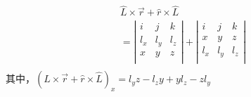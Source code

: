 $$
\begin{array}{l}
	\hat{L}\times \vec{r}+\hat{r}\times \hat{L}\\
	=\left| \begin{matrix}
	i&		j&		k\\
	l_x&		l_y&		l_z\\
	x&		y&		z\\
\end{matrix} \right|+\left| \begin{matrix}
	i&		j&		k\\
	x&		y&		z\\
	l_x&		l_y&		l_z\\
\end{matrix} \right|\\
\end{array}
$$
其中，$\left(\hat{L}\times \vec{r}+\hat{r}\times \hat{L}\right)_x= l_yz-l_zy+yl_z-zl_y $

